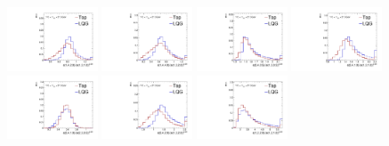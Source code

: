 \begin{figure}[]
    \begin{center}
        \includegraphics[width=0.24\textwidth]{figures/toptagging/shapes/mass_ratio_14201310.pdf}
        \includegraphics[width=0.24\textwidth]{figures/toptagging/shapes/mass_ratio_14401320.pdf}
        \includegraphics[width=0.24\textwidth]{figures/toptagging/shapes/mass_ratio_24051305.pdf}
        \includegraphics[width=0.24\textwidth]{figures/toptagging/shapes/mass_ratio_24101310.pdf}
        \includegraphics[width=0.24\textwidth]{figures/toptagging/shapes/mass_ratio_24102305.pdf}
        \includegraphics[width=0.24\textwidth]{figures/toptagging/shapes/mass_ratio_24201320.pdf}
        \includegraphics[width=0.24\textwidth]{figures/toptagging/shapes/mass_ratio_12201210.pdf}

\end{center}
\end{figure}
